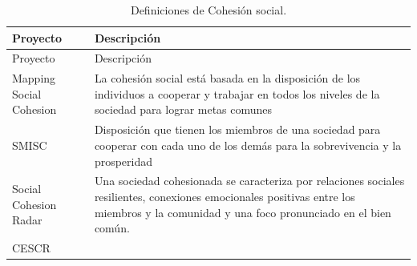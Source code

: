 \documentclass[
  12pt,
]{book}
\begin{document}
\begin{longtable}[]{@{}ll@{}}
\caption{\label{tab:concepto} Definiciones de Cohesión social.}\tabularnewline
\toprule
\begin{minipage}[b]{0.10\columnwidth}\raggedright
Proyecto\strut
\end{minipage} & \begin{minipage}[b]{0.85\columnwidth}\raggedright
Descripción\strut
\end{minipage}\tabularnewline
\midrule
\endfirsthead
\toprule
\begin{minipage}[b]{0.10\columnwidth}\raggedright
Proyecto\strut
\end{minipage} & \begin{minipage}[b]{0.85\columnwidth}\raggedright
Descripción\strut
\end{minipage}\tabularnewline
\midrule
\endhead
\begin{minipage}[t]{0.10\columnwidth}\raggedright
Mapping Social Cohesion\strut
\end{minipage} & \begin{minipage}[t]{0.85\columnwidth}\raggedright
La cohesión social está basada en la disposición de los individuos a cooperar y trabajar en todos los niveles de la sociedad para lograr metas comunes\strut
\end{minipage}\tabularnewline
\begin{minipage}[t]{0.10\columnwidth}\raggedright
SMISC\strut
\end{minipage} & \begin{minipage}[t]{0.85\columnwidth}\raggedright
Disposición que tienen los miembros de una sociedad para cooperar con cada uno de los demás para la sobrevivencia y la prosperidad\strut
\end{minipage}\tabularnewline
\begin{minipage}[t]{0.10\columnwidth}\raggedright
Social Cohesion Radar\strut
\end{minipage} & \begin{minipage}[t]{0.85\columnwidth}\raggedright
Una sociedad cohesionada se caracteriza por relaciones sociales resilientes, conexiones emocionales positivas entre los miembros y la comunidad y una foco pronunciado en el bien común.\strut
\end{minipage}\tabularnewline
\begin{minipage}[t]{0.10\columnwidth}\raggedright
CESCR\strut
\end{minipage} & \begin{minipage}[t]{0.85\columnwidth}\raggedright

\end{minipage}
\end{longtable}
\end{document}
